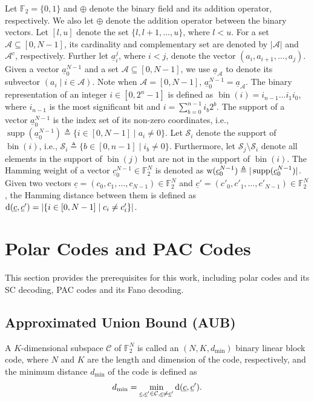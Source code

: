 \documentclass[12pt, draftclsnofoot, peerreview, onecolumn]{IEEEtran}
\theoremstyle{noparent}
\DeclareMathOperator\supp{supp}
\DeclareMathOperator\bin{bin}
\begin{document}
Let $\mathbb{F}_2=\{0,1\}$ and $\oplus$ denote the binary field and its addition operator, respectively.
We also let $\oplus$ denote the addition operator between the binary vectors.
Let $[l,u]$ denote the set $\{l, l+1, \ldots, u\}$, where $l<u$.
For a set $\mathcal{A}\subseteq[0,N-1]$, its cardinality and complementary set
are denoted by $|\mathcal{A}|$ and $\mathcal{A}^{c}$, respectively.
Further let $\underline{a}_i^j$, where $i<j$, denote the vector $(a_i, a_{i+1}, \ldots, a_j)$.
Given a vector $\underline{a}_{0}^{N-1}$ and a set $\mathcal{A} \subseteq [0,N-1]$,
we use $\underline{a}_{\mathcal{A}}$ to denote its subvector $(a_i \mid i\in\mathcal{A})$.
Note when $\mathcal{A}=[0,N-1]$, $\underline{a}_{0}^{N-1}=\underline{a}_{\mathcal{A}}$.
The binary representation of an integer $i\in [0, 2^n-1]$ is defined as $\bin(i)=i_{n-1}\ldots i_{1}i_{0}$,
where $i_{n-1}$ is the most significant bit and $i=\sum_{b=0}^{n-1}i_b 2^{b}$.
The support of a vector $\underline{a}_0^{N-1}$ is the index set of its non-zero coordinates, i.e., 
$\supp(\underline{a}_0^{N-1})\triangleq \{i\in [0,N-1] \mid a_i \neq 0\}$. 
Let $\mathcal{S}_i$ denote the support of $\bin(i)$, i.e., 
$\mathcal{S}_i\triangleq\{b\in [0,n-1] \mid  i_b \neq 0\}$.
Furthermore, let $\mathcal{S}_j \setminus \mathcal{S}_i$ denote all elements in the support of $\bin(j)$ but are not in the
support of $\bin(i)$.
The Hamming weight of a vector $\underline{c}_0^{N-1}\in \mathbb{F}_2^N$ is denoted as
${\rm w}(\underline{c}_0^{N-1})\triangleq |\supp(\underline{c}_0^{N-1})|$.
Given two vectors $\underline{c}=(c_0, c_1, \ldots, c_{N-1}) \in \mathbb{F}_2^N$ and 
$\underline{c}'=(c'_0, c'_1, \ldots, c'_{N-1}) \in \mathbb{F}_2^N$, 
the Hamming distance between them is defined as
${\rm d}(\underline{c}, \underline{c}')=|\{i\in[0,N-1] \mid c_i \neq c'_i\}|$. 


\section{Polar Codes and PAC Codes}
\label{sec_pre}
This section provides the prerequisites for this work, 
including polar codes and its SC decoding, PAC codes and its Fano decoding.



\subsection{Approximated Union Bound (AUB)}
\label{MWCs_of_Polar_Codes}


A $K$-dimensional subspace $\mathcal{C}$ of $\mathbb{F}_2^N$ is called an $(N, K, d_{\min})$ 
binary linear block code, where $N$ and $K$ are the length and dimension of the code,
respectively, and the minimum distance $d_{\min}$ of the code is defined as 
$$d_{\min} = \min_{\underline{c},\underline{c}'\in \mathcal{C}, \underline{c}\neq\underline{c}'}
{\rm d}(\underline{c}, \underline{c}').$$
\end{document}
